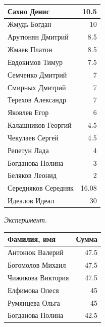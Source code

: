 \documentclass[12pt]{article}
\newlength{\h}
\newlength{\x}
\begin{document}
\begin{table}[ht]
\begin{minipage}[t]{0.48\linewidth}
\begin{tabular}{|l|r|}
      \hline
      Сахно Денис            &   10.5  \\
      \hline
      Жмудь Богдан           &     10  \\
      \hline
      Арутюнян Дмитрий       &    8.5  \\
      \hline
      Жмаев Платон           &    8.5  \\
      \hline
      Евдокимов Тимур        &    7.5  \\
      \hline
      Семченко Дмитрий       &      7  \\
      \hline
      Смирных Дмитрий        &     7  \\
      \hline
      Терехов Александр      &     7  \\
      \hline
      Яковлев Егор           &      6  \\
      \hline
      Калашников Георгий     &    4.5  \\
      \hline
      Чекулаев Сергей        &    4.5  \\
      \hline
      Репетун Лада           &      4  \\
      \hline
      Богданова Полина       &      3  \\
      \hline
      Беляков Леонид         &      2  \\
      \hline
      Середняков Середняк    &  16.08  \\
      Идеалов Идеал          &     30  \\
      \hline
    \end{tabular}
  \end{minipage}
  \hfill
  \begin{minipage}[t]{0.48\linewidth}\centering
    \begin{center}
      \textit{Эксперимент.}
    \end{center}
    \begin{tabular}{|l|r|}
      \hline
      Фамилия, имя           &  Сумма  \\
      \hline
      Антонюк Валерий        &   47.5  \\
      \hline
      Богомолов Михаил       &   47.5  \\
      \hline
      Чижикова Виктория      &   47.5  \\
      \hline
      Елфимова Олеся         &    45  \\
      \hline
      Румянцева Ольга        &    45  \\
      \hline
      Богданова Полина       &   42.5  \\

\end{tabular}
\end{minipage}
\end{table}
\end{document}

